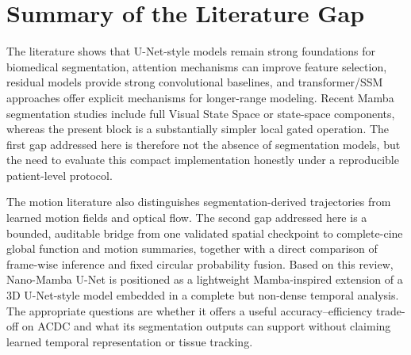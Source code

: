 \section{Summary of the Literature Gap}
The literature shows that U-Net-style models remain strong foundations for biomedical segmentation, attention mechanisms can improve feature selection, residual models provide strong convolutional baselines, and transformer/SSM approaches offer explicit mechanisms for longer-range modeling. Recent Mamba segmentation studies include full Visual State Space or state-space components, whereas the present block is a substantially simpler local gated operation. The first gap addressed here is therefore not the absence of segmentation models, but the need to evaluate this compact implementation honestly under a reproducible patient-level protocol.

The motion literature also distinguishes segmentation-derived trajectories from learned motion fields and optical flow. The second gap addressed here is a bounded, auditable bridge from one validated spatial checkpoint to complete-cine global function and motion summaries, together with a direct comparison of frame-wise inference and fixed circular probability fusion. Based on this review, Nano-Mamba U-Net is positioned as a lightweight Mamba-inspired extension of a 3D U-Net-style model embedded in a complete but non-dense temporal analysis. The appropriate questions are whether it offers a useful accuracy--efficiency trade-off on ACDC and what its segmentation outputs can support without claiming learned temporal representation or tissue tracking.
